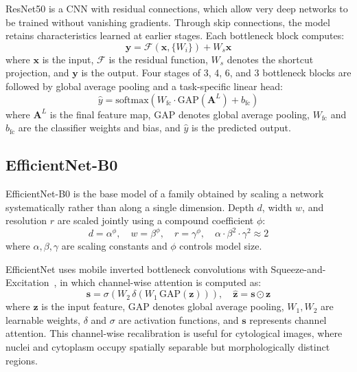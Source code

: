 \documentclass[conference]{IEEEtran}
\begin{document}
ResNet50 \cite{he2016deep} is a CNN with residual connections, which allow very deep networks to be trained without vanishing gradients. Through skip connections, the model retains characteristics learned at earlier stages. Each bottleneck block computes:
\begin{equation}
    \mathbf{y} = \mathcal{F}(\mathbf{x},\{W_i\}) + W_s\mathbf{x}
    \label{eq:resnet}
\end{equation}
where $\mathbf{x}$ is the input, $\mathcal{F}$ is the residual function, $W_s$ denotes the shortcut projection, and $\mathbf{y}$ is the output. Four stages of 3, 4, 6, and 3 bottleneck blocks are followed by global average pooling and a task-specific linear head:
\begin{equation}
    \hat{y} = \mathrm{softmax}\left(W_{\mathrm{fc}} \cdot \mathrm{GAP}(\mathbf{A}^L) + b_{\mathrm{fc}}\right)
\end{equation}
where $\mathbf{A}^L$ is the final feature map, $\mathrm{GAP}$ denotes global average pooling, $W_{\mathrm{fc}}$ and $b_{\mathrm{fc}}$ are the classifier weights and bias, and $\hat{y}$ is the predicted output.

\subsection{EfficientNet-B0}

EfficientNet-B0 \cite{tan2019efficientnet} is the base model of a family obtained by scaling a network systematically rather than along a single dimension. Depth $d$, width $w$, and resolution $r$ are scaled jointly using a compound coefficient $\phi$:
\begin{equation}
    d = \alpha^\phi,\quad w = \beta^\phi,\quad r = \gamma^\phi,\quad
    \alpha \cdot \beta^2 \cdot \gamma^2 \approx 2
    \label{eq:effnet}
\end{equation}
where $\alpha, \beta, \gamma$ are scaling constants and $\phi$ controls model size.

EfficientNet uses mobile inverted bottleneck convolutions with Squeeze-and-Excitation~\cite{hu2018senet}, in which channel-wise attention is computed as:
\begin{equation}
    \mathbf{s} = \sigma(W_2\,\delta(W_1\,\mathrm{GAP}(\mathbf{z}))), \quad
    \hat{\mathbf{z}} = \mathbf{s} \odot \mathbf{z}
    \label{eq:se}
\end{equation}
where $\mathbf{z}$ is the input feature, $\mathrm{GAP}$ denotes global average pooling, $W_1, W_2$ are learnable weights, $\delta$ and $\sigma$ are activation functions, and $\mathbf{s}$ represents channel attention. This channel-wise recalibration is useful for cytological images, where nuclei and cytoplasm occupy spatially separable but morphologically distinct regions.
\end{document}
